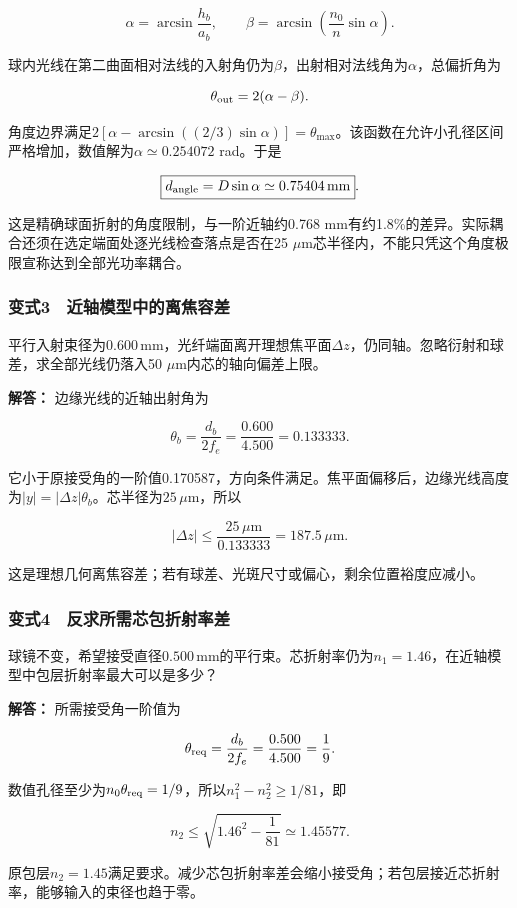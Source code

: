 \documentclass[12pt,a4paper,fontset=fandol]{ctexart}
\begin{document}
\[
\alpha=\arcsin\frac{h_b}{a_b},\qquad
\beta=\arcsin\left(\frac{n_0}{n}\sin\alpha\right).
\]

球内光线在第二曲面相对法线的入射角仍为\(\beta\)，出射相对法线角为\(\alpha\)，总偏折角为

\[
\theta_{\rm out}=2(\alpha-\beta).
\]

角度边界满足\(2[\alpha-\arcsin((2/3)\sin\alpha)]=\theta_{\max}\)。该函数在允许小孔径区间严格增加，数值解为\(\alpha\simeq0.254072\)
rad。于是

\[
\boxed{
d_{\rm angle}=D\sin\alpha\simeq0.75404\,\mathrm{mm}}.
\]

这是精确球面折射的角度限制，与一阶近轴约0.768
mm有约1.8\%的差异。实际耦合还须在选定端面处逐光线检查落点是否在25
\(\mu\)m芯半径内，不能只凭这个角度极限宣称达到全部光功率耦合。

\subsubsection{变式3　近轴模型中的离焦容差}\label{ux53d8ux5f0f3-ux8fd1ux8f74ux6a21ux578bux4e2dux7684ux79bbux7126ux5bb9ux5dee}

平行入射束径为\(0.600\,\mathrm{mm}\)，光纤端面离开理想焦平面\(\Delta z\)，仍同轴。忽略衍射和球差，求全部光线仍落入50
\(\mu\)m内芯的轴向偏差上限。

\textbf{解答：} 边缘光线的近轴出射角为

\[
\theta_b=\frac{d_b}{2f_e}
=\frac{0.600}{4.500}
=0.133333.
\]

它小于原接受角的一阶值0.170587，方向条件满足。焦平面偏移后，边缘光线高度为\(|y|=|\Delta z|\theta_b\)。芯半径为\(25\,\mu\mathrm m\)，所以

\[
\boxed{
|\Delta z|\le
\frac{25\,\mu\mathrm m}{0.133333}
=187.5\,\mu\mathrm m}.
\]

这是理想几何离焦容差；若有球差、光斑尺寸或偏心，剩余位置裕度应减小。

\par\noindent\begin{minipage}{\linewidth}
\subsubsection{变式4　反求所需芯包折射率差}\label{ux53d8ux5f0f4-ux53cdux6c42ux6240ux9700ux82afux5305ux6298ux5c04ux7387ux5dee}

球镜不变，希望接受直径\(0.500\,\mathrm{mm}\)的平行束。芯折射率仍为\(n_1=1.46\)，在近轴模型中包层折射率最大可以是多少？

\textbf{解答：} 所需接受角一阶值为

\[
\theta_{\rm req}=\frac{d_b}{2f_e}
=\frac{0.500}{4.500}=\frac19.
\]

数值孔径至少为\(n_0\theta_{\rm req}=1/9\)，所以\(n_1^2-n_2^2\ge1/81\)，即

\[
\boxed{
n_2\le\sqrt{1.46^2-\frac1{81}}
\simeq1.45577}.
\]

原包层\(n_2=1.45\)满足要求。减少芯包折射率差会缩小接受角；若包层接近芯折射率，能够输入的束径也趋于零。

\end{minipage}\par
\clearpage
\end{document}
